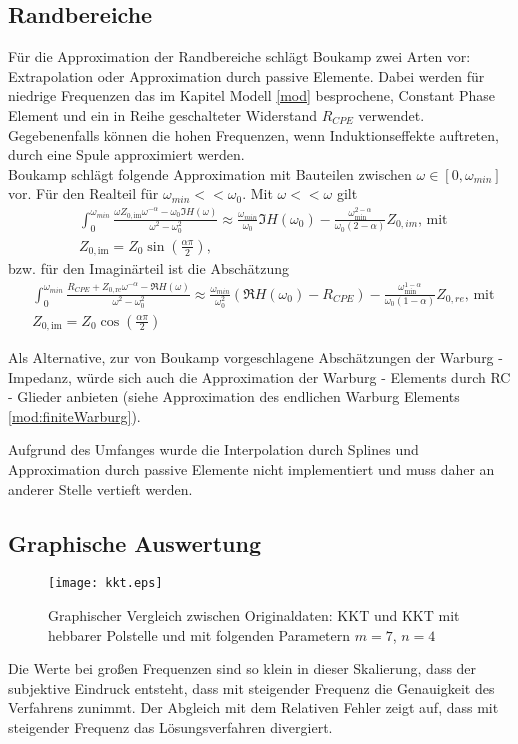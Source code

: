 \subsection{Randbereiche}
Für die Approximation der Randbereiche schlägt Boukamp \cite{Boukamp1993} zwei Arten vor: Extrapolation oder Approximation durch passive Elemente. Dabei werden für niedrige Frequenzen das im Kapitel Modell \ref{mod} besprochene, Constant Phase Element und ein in Reihe geschalteter Widerstand $R_{CPE}$ verwendet. Gegebenenfalls können die hohen Frequenzen, wenn Induktionseffekte auftreten, durch eine Spule approximiert werden.\\ Boukamp schlägt folgende Approximation mit Bauteilen zwischen $\omega \in [0, \omega_{min}]$ vor. Für den Realteil für $\omega_{min} << \omega_0$. Mit $\omega <<\omega$ gilt
\begin{align}
&\int_0^{\omega_{min}} \frac{\omega Z_{0, \text{im}} \omega^{-\alpha} - \omega_0 \Im{H(\omega)}}{\omega^2 - \omega_0^2} \approx \frac{\omega_{min}}{\omega_0} \Im{H(\omega_0)} - \frac{\omega_{\min}^{2-\alpha}}{\omega_0 (2-\alpha)} Z_{0, im} \text{, mit }\\
&Z_{0, \text{im}} = Z_0 \sin(\frac{\alpha \pi}{2}) \text{, }
\end{align} bzw. für den Imaginärteil ist die Abschätzung
\begin{align}
&\int_0^{\omega_{min}} \frac{ R_{CPE} + Z_{0, \text{re}} \omega^{-\alpha} - \Re{H(\omega)}}{\omega^2 - \omega_0^2}
\approx \frac{\omega_{min}}{\omega_0^2} (\Re{H(\omega_0)} - R_{CPE}) - \frac{\omega_{\min}^{1-\alpha}}{\omega_0 (1-\alpha)} Z_{0, re} \text{, mit }\\
&Z_{0, \text{im}} = Z_0 \cos(\frac{\alpha \pi}{2})
\end{align}
\begin{bem}
	Als Alternative, zur von Boukamp \cite{Boukamp1993} vorgeschlagene Abschätzungen der Warburg - Impedanz, würde sich auch die Approximation der Warburg - Elements durch RC - Glieder anbieten (siehe Approximation des endlichen Warburg Elements \ref{mod:finiteWarburg}).
\end{bem}

Aufgrund des Umfanges wurde die Interpolation durch Splines und Approximation durch passive Elemente nicht implementiert und muss daher an anderer Stelle vertieft werden. 
\subsection{Graphische Auswertung}
\begin{figure}[h]
	\centering	
	\texttt{[image: kkt.eps]}
	\caption{Graphischer Vergleich zwischen Originaldaten: KKT und KKT mit hebbarer Polstelle und mit folgenden Parametern $m=7$,  $n=4$}
	\label{fig:kkt}
\end{figure}
Die Werte bei großen Frequenzen sind so klein in dieser Skalierung, dass der subjektive Eindruck entsteht, dass mit steigender Frequenz die Genauigkeit des Verfahrens zunimmt. Der Abgleich mit dem Relativen Fehler zeigt auf, dass mit steigender Frequenz das Lösungsverfahren divergiert. 

